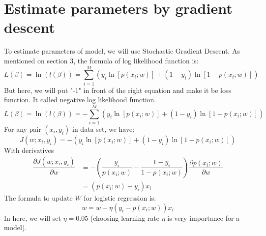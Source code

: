 \documentclass{article}
\begin{document}
\section {Estimate parameters by gradient descent}
    To estimate parameters of model, we will use Stochastic Gradient Descent. As mentioned on section 3, the formula of log likelihood function is: 
    \begin{equation} 
         L(\beta) = \ln(l(\beta)) = \sum_{i=1}^{M} \left(y_{i}\ln[p(x_{i}; w)] + (1 - y_{i})\ln[1 -  p(x_{i}; w)]\right)
    \end{equation} 
    But here, we will put "-1" in front of the right equation and make it be loss function. It called negative log likelihood function.
    \begin{equation} 
        L(\beta) = \ln(l(\beta)) = - \sum_{i=1}^{M} \left(y_{i}\ln[p(x_{i}; w)] + (1 - y_{i})\ln[1 -  p(x_{i}; w)]\right)
    \end{equation} 
    For any pair $(x_{i}, y_{i})$ in data set, we have: 
    \begin{equation} 
            J(w; x_{i}, y_{i}) = -\left(y_{i}\ln \left[p(x_{i}; w)\right] + (1 - y_{i})\ln \left[1 -  p(x_{i}; w)\right]\right)
    \end{equation}
    With derivatives
    \begin{align} 
        \dfrac{\partial J(w; x_{i}, y_{i})}{\partial w} &= - \left(
        \dfrac{y_{i}}{p(x_{i}; w)} - \dfrac{1 - y_{i}}{1 - p(x_{i}; w)} \right) \dfrac{\partial p(x_{i}; w)}{\partial w}
        \nonumber
        \\
        &= \left(p(x_{i}; w) - y_{i}\right)x_{i}
    \end{align} 
    The formula to update $W$ for logistic regression is: 
    \begin{equation}
        w = w + \eta(y_{i} - p(x_{i}; w))x_{i}
    \end{equation}
    In here, we will set $\eta = 0.05$ (choosing learning rate $\eta$ is very importance for a model).
    \newpage 
    
\end{document}
